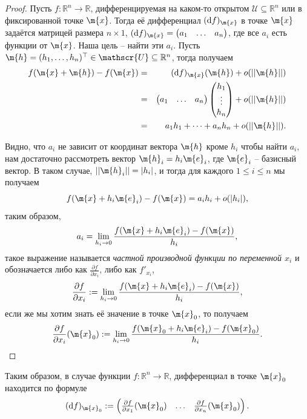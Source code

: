 \begin{proof}
   Пусть $f:\mathbb{R}^n \to \mathbb{R}$, дифференцируемая на каком-то открытом $\mathscr{U} \subseteq \mathbb{R}^n$ или в фиксированной точке $\m{x}$. Тогда её дифференциал $(\mathrm{d}f)_\m{x}$ в точке $\m{x}$ задаётся матрицей размера $n\times 1$, $(\mathrm{d}f)_\m{x} = \begin{pmatrix}
    a_1 & \ldots & a_n
\end{pmatrix}$, где все $a_i$ есть функции от $\m{x}$. Наша цель -- найти эти $a_i$. Пусть $\m{h} = (h_1, \ldots, h_n)^\top \in \mathscr{U} \subseteq \mathbb{R}^n$, тогда получаем
\begin{eqnarray*}
    f(\m{x} + \m{h}) - f(\m{x}) &=& (\mathrm{d}f)_\m{x}(\m{h}) + o(||\m{h}||) \\
    &=& \begin{pmatrix}
        a_1 & \ldots & a_n
    \end{pmatrix} \begin{pmatrix}
        h_1 \\ \vdots \\ h_n  \end{pmatrix} + o(||\m{h}||) \\
        &=& a_1h_1 + \cdots + a_nh_n + o(||\m{h}||).
\end{eqnarray*}

Видно, что $a_i$ не зависит от координат вектора $\m{h}$ кроме $h_i$ \ie чтобы найти $a_i$, нам достаточно рассмотреть вектор $\m{h}_i = h_i \m{e}_i$, где $\m{e}_i$ -- базисный вектор. В таком случае, $||\m{h}_i|| = |h_i|$, и тогда для каждого $1 \le i \le n$ мы получаем
\[
 f(\m{x} + h_i \m{e}_i) - f(\m{x}) = a_ih_i + o(|h_i|),
\]
таким образом, 
\[
 a_i = \lim_{h_i \to 0} \frac{f(\m{x} + h_i \m{e}_i) - f(\m{x})}{h_i},
\]
такое выражение называется \textit{частной производной функции по переменной $x_i$} и обозначается либо как $\frac{\partial f}{\partial x_i}$, либо как $f'_{x_i}$, \ie 
\[
 \frac{\partial f}{\partial x_i}: = \lim_{h_i \to 0} \frac{f(\m{x} + h_i \m{e}_i) - f(\m{x})}{h_i},
\]
если же мы хотим знать её значение в точке $\m{x}_0$, то получаем
\[
 \frac{\partial f}{\partial x_i}(\m{x}_0): = \lim_{h_i \to 0} \frac{f(\m{x}_0 + h_i \m{e}_i) - f(\m{x}_0)}{h_i}.
\]
\end{proof}


Таким образом, в случае функции $f:\mathbb{R}^n \to \mathbb{R}$, дифференциал в точке $\m{x}_0$ находится по формуле
\[
 (\mathrm{d}f)_{\m{x}_0}: = \begin{pmatrix}
     \frac{\partial f}{\partial x_1}(\m{x}_0) & \ldots & \frac{\partial f}{\partial x_n}(\m{x}_0)
 \end{pmatrix}.
\]

